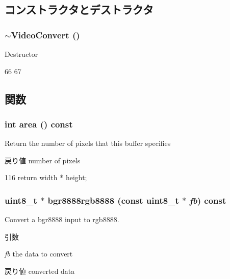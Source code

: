 \subsection{コンストラクタとデストラクタ}
\hypertarget{classVideoConvert_a79b61dd8dc5db73c15b8bba9ce175923}{
\subsubsection[{$\sim$VideoConvert}]{\setlength{\rightskip}{0pt plus 5cm}$\sim${\bf VideoConvert} ()}}
\label{classVideoConvert_a79b61dd8dc5db73c15b8bba9ce175923}
Destructor 


\begin{DoxyCode}
66 {
67 }
\end{DoxyCode}


\subsection{関数}
\hypertarget{classVideoConvert_a93dbb554c75a0bded227ab0320be72eb}{
\subsubsection[{area}]{\setlength{\rightskip}{0pt plus 5cm}int area () const}}
\label{classVideoConvert_a93dbb554c75a0bded227ab0320be72eb}
Return the number of pixels that this buffer specifies \begin{DoxyReturn}{戻り値}
number of pixels 
\end{DoxyReturn}



\begin{DoxyCode}
116 { return width * height; }
\end{DoxyCode}
\hypertarget{classVideoConvert_a2d9e7d7d1a3dccee4b57b721fb90e909}{
\subsubsection[{bgr8888rgb8888}]{\setlength{\rightskip}{0pt plus 5cm}uint8\_\-t $\ast$ bgr8888rgb8888 (const uint8\_\-t $\ast$ {\em fb}) const}}
\label{classVideoConvert_a2d9e7d7d1a3dccee4b57b721fb90e909}
Convert a bgr8888 input to rgb8888. 
\begin{DoxyParams}{引数}
\item[{\em fb}]the data to convert \end{DoxyParams}
\begin{DoxyReturn}{戻り値}
converted data 
\end{DoxyReturn}



